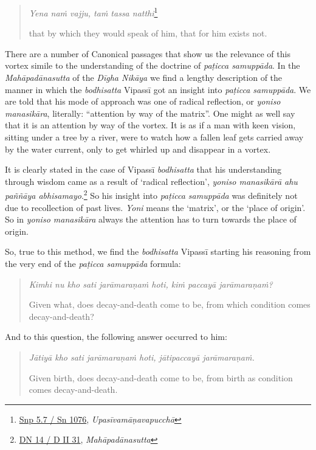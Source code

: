 \begin{quote}
\emph{Yena naṁ vajju, taṁ tassa natthi}\footnote{\href{https://suttacentral.net/snp5.7/pli/ms}{Snp 5.7 / Sn 1076}, \emph{Upasīvamāṇavapucchā}}

that by which they would speak of him, that for him exists not.
\end{quote}

There are a number of Canonical passages that show us the relevance of this vortex simile to the understanding of the doctrine of \emph{paṭicca samuppāda}. In the \emph{Mahāpadānasutta} of the \emph{Dīgha Nikāya} we find a lengthy description of the manner in which the \emph{bodhisatta} Vipassī got an insight into \emph{paṭicca samuppāda}. We are told that his mode of approach was one of radical reflection, or \emph{yoniso manasikāra}, literally: ``attention by way of the matrix''. One might as well say that it is an attention by way of the vortex. It is as if a man with keen vision, sitting under a tree by a river, were to watch how a fallen leaf gets carried away by the water current, only to get whirled up and disappear in a vortex.

It is clearly stated in the case of Vipassī \emph{bodhisatta} that his understanding through wisdom came as a result of `radical reflection', \emph{yoniso manasikārā ahu paññāya abhisamayo}.\footnote{\href{https://suttacentral.net/dn14/pli/ms}{DN 14 / D II 31}, \emph{Mahāpadānasutta}} So his insight into \emph{paṭicca samuppāda} was definitely not due to recollection of past lives. \emph{Yoni} means the `matrix', or the `place of origin'. So in \emph{yoniso manasikāra} always the attention has to turn towards the place of origin.

So, true to this method, we find the \emph{bodhisatta} Vipassī starting his reasoning from the very end of the \emph{paṭicca samuppāda} formula:

\begin{quote}
\emph{Kimhi nu kho sati jarāmaraṇaṁ hoti, kiṁ paccayā jarāmaraṇaṁ?}

Given what, does decay-and-death come to be, from which condition comes decay-and-death?
\end{quote}

And to this question, the following answer occurred to him:

\begin{quote}
\emph{Jātiyā kho sati jarāmaraṇaṁ hoti, jātipaccayā jarāmaraṇaṁ.}

Given birth, does decay-and-death come to be, from birth as condition comes decay-and-death.
\end{quote}

